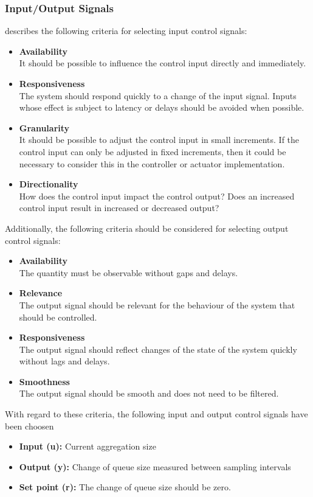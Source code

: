 \subsubsection{Input/Output Signals}

\cite{Janert:2013aa} describes the following criteria for selecting input control signals:
\begin{itemize}
	\item \textbf{Availability}\\
	It should be possible to influence the control input directly and immediately.
	\item \textbf{Responsiveness}\\
	The system should respond quickly to a change of the input signal. Inputs whose effect is subject to latency or delays should be avoided when possible.
	\item \textbf{Granularity}\\
	It should be possible to adjust the control input in small increments. If the control input can only be adjusted in fixed increments, then it could be necessary to consider this in the controller or actuator implementation.
	\item \textbf{Directionality}\\
	How does the control input impact the control output? Does an increased control input result in increased or decreased output?
\end{itemize}

Additionally, the following criteria should be considered for selecting output control signals:

\begin{itemize}
	\item \textbf{Availability}\\
	The quantity must be observable without gaps and delays.
	\item \textbf{Relevance}\\
	The output signal should be relevant for the behaviour of the system that should be controlled. 
	\item \textbf{Responsiveness}\\
	The output signal should reflect changes of the state of the system quickly without lags and delays.
	\item \textbf{Smoothness}\\
	The output signal should be smooth and does not need to be filtered.
\end{itemize}

With regard to these criteria, the following input and output control signals have been choosen 
\begin{itemize}
	\item \textbf{Input (u):} Current aggregation size
	\item \textbf{Output (y):} Change of queue size measured between sampling intervals
	\item \textbf{Set point (r):} The change of queue size should be zero.
\end{itemize}

